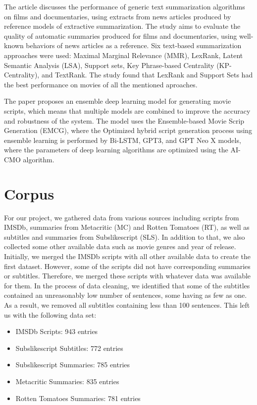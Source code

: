 \documentclass[fleqn,moreauthors,10pt]{ds_report}
\begin{document}
The article \cite{APARICIO20167} discusses the performance of generic text summarization algorithms on films and documentaries, using extracts from news articles produced by reference models of extractive summarization. The study aims to evaluate the quality of automatic summaries produced for films and documentaries, using well-known behaviors of news articles as a reference. Six text-based summarization approaches were used: Maximal Marginal Relevance (MMR), LexRank, Latent Semantic Analysis (LSA), Support sets, Key Phrase-based Centrality (KP-Centrality), and TextRank. The study found that LexRank and Support Sets had the best performance on movies of all the mentioned aproaches.

The paper \cite{DHARANIYA2023102150} proposes an ensemble deep learning model for generating movie scripts, which means that multiple models are combined to improve the accuracy and robustness of the system.  The model uses the Ensemble-based Movie Scrip Generation (EMCG), where the Optimized hybrid script generation process using ensemble learning is performed by Bi-LSTM, GPT3, and GPT Neo X models, where the parameters of deep learning algorithms are optimized using the AI-CMO algorithm.

\section*{Corpus}

For our project, we gathered data from various sources including scripts from IMSDb, summaries from Metacritic (MC) and Rotten Tomatoes (RT), as well as subtitles and summaries from Subslikescript (SLS). In addition to that, we also collected some other available data such as movie genres and year of release. Initially, we merged the IMSDb scripts with all other available data to create the first dataset. However, some of the scripts did not have corresponding summaries or subtitles. Therefore, we merged these scripts with whatever data was available for them. In the process of data cleaning, we identified that some of the subtitles contained an unreasonably low number of sentences, some having as few as one. As a result, we removed all subtitles containing less than 100 sentences. This left us with the following data set:
\begin{itemize}
  \item IMSDb Scripts: 943 entries
  \item Subslikescript Subtitles: 772 entries
  \item Subslikescript Summaries: 785 entries
  \item Metacritic Summaries: 835 entries
  \item Rotten Tomatoes Summaries: 781 entries
\end{itemize}
\end{document}
